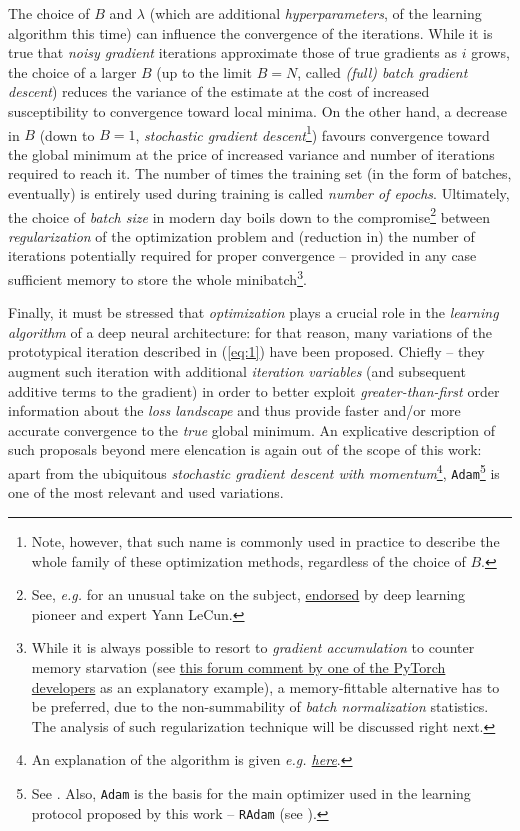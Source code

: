 The choice of $B$ and $\lambda$ (which are additional \textit{hyperparameters}, of the learning algorithm this time) can influence the convergence of the iterations. While it is true that \textit{noisy gradient} iterations approximate those of true gradients as $i$ grows, the choice of a larger $B$ (up to the limit $B=N$, called \textit{(full) batch gradient descent}) reduces the variance of the estimate at the cost of increased susceptibility to convergence toward local minima. On the other hand, a decrease in $B$ (down to $B=1$, \textit{stochastic gradient descent}\footnote{Note, however, that such name is commonly used in practice to describe the whole family of these optimization methods, regardless of the choice of $B$.}) favours convergence toward the global minimum at the price of increased variance and number of iterations required to reach it. The number of times the training set (in the form of batches, eventually) is entirely used during training is called \textit{number of epochs}. Ultimately, the choice of \textit{batch size} in modern day boils down to the compromise\footnote{See, \textit{e.g.} \cite{MastersLuschi2018RevisitingSB} for an unusual take on the subject,  \href{https://twitter.com/ylecun/status/989610208497360896?lang=en}{endorsed} by deep learning pioneer and expert Yann LeCun.} between \textit{regularization} of the optimization problem and (reduction in) the number of iterations potentially required for proper convergence -- provided in any case sufficient memory to store the whole minibatch\footnote{While it is always possible to resort to \textit{gradient accumulation} to counter memory starvation (see \href{https://discuss.pytorch.org/t/why-do-we-need-to-set-the-gradients-manually-to-zero-in-pytorch/4903/20}{this forum comment by one of the PyTorch developers} as an explanatory example), a memory-fittable alternative has to be preferred, due to the non-summability of \textit{batch normalization} statistics. The analysis of such regularization technique will be discussed right next.}.

Finally, it must be stressed that \textit{optimization} plays a crucial role in the \textit{learning algorithm} of a deep neural architecture: for that reason, many variations of the prototypical iteration described in (\ref{eq:1}) have been proposed. Chiefly -- they augment such iteration with additional \textit{iteration variables} (and subsequent additive terms to the gradient) in order to better exploit \textit{greater-than-first} order information about the \textit{loss landscape} and thus provide faster and/or more accurate convergence to the \textit{true} global minimum. An explicative description of such proposals beyond mere elencation is again out of the scope of this work: apart from the ubiquitous \textit{stochastic gradient descent with momentum}\footnote{An explanation of the algorithm is given \textit{e.g. \href{https://paperswithcode.com/method/sgd-with-momentum}{here}}.}, \texttt{Adam}\footnote{See \cite{KingmaBa2015Adam}. Also, \texttt{Adam} is the basis for the main optimizer used in the learning protocol proposed by this work -- \texttt{RAdam} (see \cite{LiuEtAl2020OnTheVariance}).} is one of the most relevant and used variations.


